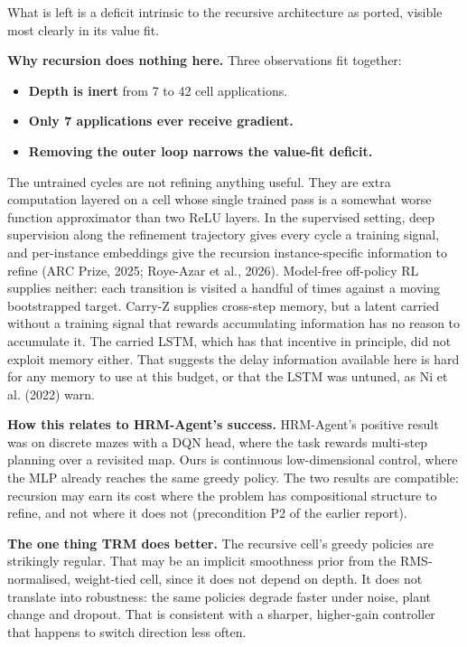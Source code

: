 \documentclass[11pt]{article}
\begin{document}
What is left is a deficit intrinsic to the recursive architecture as ported, visible most clearly in its value fit.



\textbf{Why recursion does nothing here.} Three observations fit together:

\begin{itemize}
\item \textbf{Depth is inert} from 7 to 42 cell applications.
\item \textbf{Only 7 applications ever receive gradient.}
\item \textbf{Removing the outer loop narrows the value-fit deficit.}
\end{itemize}



The untrained cycles are not refining anything useful. They are extra computation layered on a cell whose single trained pass is a somewhat worse function approximator than two ReLU layers. In the supervised setting, deep supervision along the refinement trajectory gives every cycle a training signal, and per-instance embeddings give the recursion instance-specific information to refine (ARC Prize, 2025; Roye-Azar et al., 2026). Model-free off-policy RL supplies neither: each transition is visited a handful of times against a moving bootstrapped target. Carry-Z supplies cross-step memory, but a latent carried without a training signal that rewards accumulating information has no reason to accumulate it. The carried LSTM, which has that incentive in principle, did not exploit memory either. That suggests the delay information available here is hard for any memory to use at this budget, or that the LSTM was untuned, as Ni et al. (2022) warn.



\textbf{How this relates to HRM-Agent's success.} HRM-Agent's positive result was on discrete mazes with a DQN head, where the task rewards multi-step planning over a revisited map. Ours is continuous low-dimensional control, where the MLP already reaches the same greedy policy. The two results are compatible: recursion may earn its cost where the problem has compositional structure to refine, and not where it does not (precondition P2 of the earlier report).



\textbf{The one thing TRM does better.} The recursive cell's greedy policies are strikingly regular. That may be an implicit smoothness prior from the RMS-normalised, weight-tied cell, since it does not depend on depth. It does not translate into robustness: the same policies degrade faster under noise, plant change and dropout. That is consistent with a sharper, higher-gain controller that happens to switch direction less often.
\end{document}
